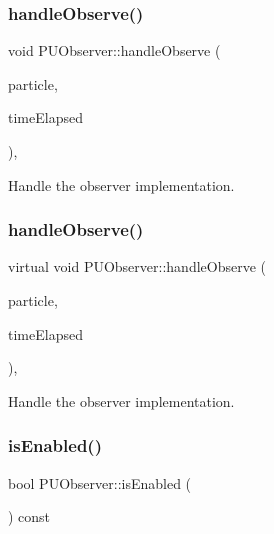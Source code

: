 \subsubsection{\texorpdfstring{handle\+Observe()}{handleObserve()}\hspace{0.1cm}{\footnotesize\ttfamily [1/2]}}
{\footnotesize\ttfamily void P\+U\+Observer\+::handle\+Observe (\begin{DoxyParamCaption}\item[{\hyperlink{structPUParticle3D}{P\+U\+Particle3D} $\ast$}]{particle,  }\item[{float}]{time\+Elapsed }\end{DoxyParamCaption})\hspace{0.3cm}{\ttfamily [protected]}, {\ttfamily [virtual]}}

Handle the observer implementation. \mbox{\label{classPUObserver_ac40b9b0e19178cfc83f7c389d40bce59}} 
\subsubsection{\texorpdfstring{handle\+Observe()}{handleObserve()}\hspace{0.1cm}{\footnotesize\ttfamily [2/2]}}
{\footnotesize\ttfamily virtual void P\+U\+Observer\+::handle\+Observe (\begin{DoxyParamCaption}\item[{\hyperlink{structPUParticle3D}{P\+U\+Particle3D} $\ast$}]{particle,  }\item[{float}]{time\+Elapsed }\end{DoxyParamCaption})\hspace{0.3cm}{\ttfamily [protected]}, {\ttfamily [virtual]}}

Handle the observer implementation. \mbox{\label{classPUObserver_a5f09175e0647409938779df070433660}} 
\subsubsection{\texorpdfstring{is\+Enabled()}{isEnabled()}\hspace{0.1cm}{\footnotesize\ttfamily [1/2]}}
{\footnotesize\ttfamily bool P\+U\+Observer\+::is\+Enabled (\begin{DoxyParamCaption}\item[{void}]{ }\end{DoxyParamCaption}) const\hspace{0.3cm}{\ttfamily [virtual]}}


